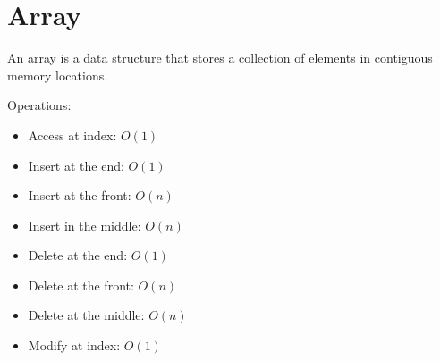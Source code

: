 \chapter{Array}

An array is a data structure that stores a collection of elements in contiguous memory locations.

Operations:
\begin{itemize}
  \item Access at index: $O(1)$
  \item Insert at the end: $O(1)$
  \item Insert at the front: $O(n)$
  \item Insert in the middle: $O(n)$
  \item Delete at the end: $O(1)$
  \item Delete at the front: $O(n)$
  \item Delete at the middle: $O(n)$
  \item Modify at index: $O(1)$
\end{itemize}
